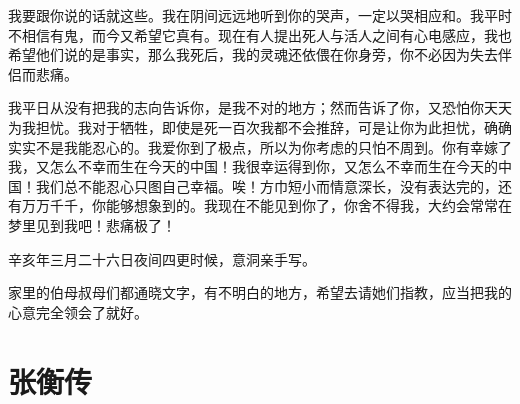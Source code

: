 \documentclass[12pt,UTF-8,openany,a4]{ctexbook}
\begin{document}
\begin{large}
    我要跟你说的话就这些。我在阴间远远地听到你的哭声，一定以哭相应和。我平时不相信有鬼，而今又希望它真有。现在有人提出死人与活人之间有心电感应，我也希望他们说的是事实，那么我死后，我的灵魂还依偎在你身旁，你不必因为失去伴侣而悲痛。
    
    我平日从没有把我的志向告诉你，是我不对的地方；然而告诉了你，又恐怕你天天为我担忧。我对于牺牲，即使是死一百次我都不会推辞，可是让你为此担忧，确确实实不是我能忍心的。我爱你到了极点，所以为你考虑的只怕不周到。你有幸嫁了我，又怎么不幸而生在今天的中国！我很幸运得到你，又怎么不幸而生在今天的中国！我们总不能忍心只图自己幸福。唉！方巾短小而情意深长，没有表达完的，还有万万千千，你能够想象到的。我现在不能见到你了，你舍不得我，大约会常常在梦里见到我吧！悲痛极了！
    
    辛亥年三月二十六日夜间四更时候，意洞亲手写。
    
    家里的伯母叔母们都通晓文字，有不明白的地方，希望去请她们指教，应当把我的心意完全领会了就好。
    
\end{large}



\chapter{张衡传}
\end{document}
